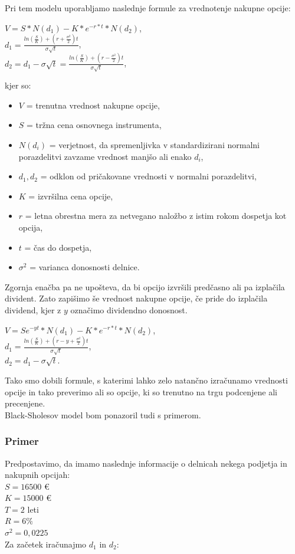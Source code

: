 Pri tem modelu uporabljamo naslednje formule za vrednotenje nakupne opcije:\\
\begin{center}
$V=S * N(d_1) - K * e^{-r*t} * N(d_2)$, 
\\[0,5 cm]
$d_1 = \tfrac{ln(\tfrac{S}{K}) + (r + \tfrac{\sigma^2}{2}) t}{\sigma \sqrt{t}}$, 
\\[0,5 cm]
$d_2 = d_1 - \sigma \sqrt{t} =  \tfrac{ln(\tfrac{S}{K}) + (r - \tfrac{\sigma^2}{2}) t}{\sigma \sqrt{t}}$,
\end{center}

kjer so:
\begin{itemize}
\item $V$ = trenutna vrednost nakupne opcije,
\item $S$ = tržna cena osnovnega instrumenta,
\item $N(d_i)$ = verjetnost, da spremenljivka v standardizirani normalni porazdelitvi zavzame vrednost manjšo ali enako $d_i$,
\item $d_1,d_2$ = odklon od pričakovane vrednosti v normalni porazdelitvi,
\item $K$ = izvršilna cena opcije,
\item $r$ = letna obrestna mera za netvegano naložbo z istim rokom dospetja kot opcija,
\item $t$ = čas do dospetja,
\item $\sigma^2$ = varianca donosnosti delnice.
\end{itemize}

Zgornja enačba pa ne upošteva, da bi opcijo izvršili predčasno ali pa izplačila divident. Zato zapišimo še vrednost nakupne opcije, če pride do izplačila dividend, kjer z $y$ označimo dividendno donosnost.
\begin{center}
$V=Se^{-yt}  * N(d_1) - K * e^{-r*t} * N(d_2)$, 
\\[0,5 cm]
$d_1 = \tfrac{ln(\tfrac{S}{K}) + (r - y + \tfrac{\sigma^2}{2}) t}{\sigma \sqrt{t}}$, 
\\[0,5 cm]
$d_2 = d_1 - \sigma \sqrt{t}$.
\end{center}

Tako smo dobili formule, s katerimi lahko zelo natančno izračunamo vrednosti opcije in tako preverimo ali so opcije, ki so trenutno na trgu podcenjene ali precenjene.\\
Black-Sholesov model bom ponazoril tudi s primerom.\\

\subsubsection{Primer}
Predpostavimo, da imamo naslednje informacije o delnicah nekega podjetja in nakupnih opcijah:\\
$S = 16500$ €\\
$K = 15000$ €\\
$T = 2$ leti\\
$R = 6 \%$\\
$\sigma^2 = 0,0225$ \\
Za začetek iračunajmo $d_1$ in $d_2$:\\

